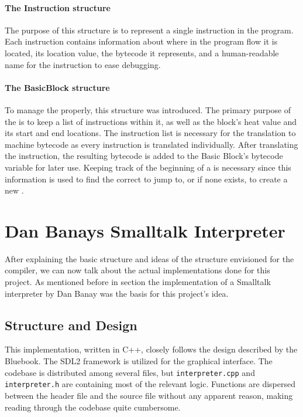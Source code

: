 \paragraph{The Instruction structure}
The purpose of this structure is to represent a single instruction in the program. 
Each instruction contains information about where in the program flow it is located, its location value, the bytecode it represents, and a human-readable name for the instruction to ease debugging.

\paragraph{The BasicBlock structure}
To manage the \bbs{} properly, this structure was introduced.
The primary purpose of the \bb{} is to keep a list of instructions within it, as well as the block's heat value and its start and end locations. 
The instruction list is necessary for the translation to machine bytecode as every instruction is translated individually. After translating the instruction, the resulting bytecode is added to the Basic Block's bytecode variable for later use. 
Keeping track of the beginning of a \bb{} is necessary since this information is used to find the correct \bb{} to jump to, or if none exists, to create a new \bb{}.

\section{Dan Banays Smalltalk Interpreter}
After explaining the basic structure and ideas of the structure envisioned for the \jit{} compiler, we can now talk about the actual implementations done for this project. As mentioned before in section  the implementation of a Smalltalk interpreter by Dan Banay \cite{dbanayST} was the basis for this project's idea.
\subsection{Structure and Design}
This implementation, written in C++, closely follows the design described by the Bluebook. The SDL2 framework is utilized for the graphical interface.
The codebase is distributed among several files, but \texttt{interpreter.cpp} and \texttt{interpreter.h} are containing most of the relevant logic. Functions are dispersed between the header file and the source file without any apparent reason, making reading through the codebase quite cumbersome. 

